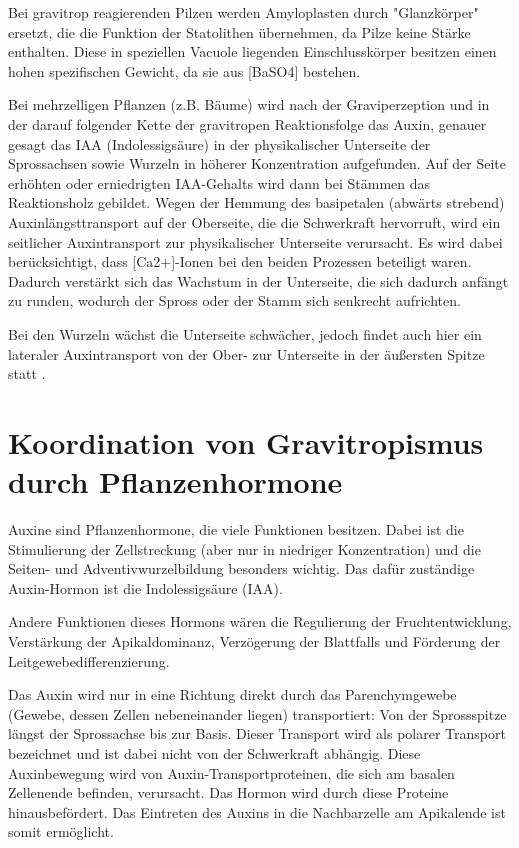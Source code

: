\documentclass[
a4paper, 
11pt, 
ngerman,
listof=totoc,
bibliography=totocnumbered,
abstracton
]{scrreprt}
\begin{document}
Bei gravitrop reagierenden Pilzen werden Amyloplasten durch "Glanzkörper" ersetzt, die die Funktion der Statolithen übernehmen, da Pilze keine Stärke enthalten. Diese in speziellen Vacuole liegenden Einschlusskörper besitzen einen hohen spezifischen Gewicht, da sie aus [BaSO4] bestehen.

Bei mehrzelligen Pflanzen (z.B. Bäume) wird  nach der Graviperzeption und in der darauf folgender Kette der gravitropen Reaktionsfolge  das Auxin, genauer gesagt das IAA (Indolessigsäure) in der physikalischer Unterseite der Sprossachsen sowie Wurzeln in höherer Konzentration aufgefunden.
Auf der Seite erhöhten oder erniedrigten IAA-Gehalts wird dann bei Stämmen das Reaktionsholz gebildet.
Wegen der Hemmung des basipetalen (abwärts strebend) Auxinlängsttransport auf der Oberseite, die die Schwerkraft hervorruft, wird ein seitlicher Auxintransport zur physikalischer Unterseite verursacht. Es wird dabei berücksichtigt, dass [Ca2+]-Ionen bei den beiden Prozessen beteiligt waren.
Dadurch verstärkt sich das Wachstum in der Unterseite, die sich dadurch anfängt zu runden, wodurch der Spross oder der Stamm sich senkrecht aufrichten. 

Bei den Wurzeln wächst die Unterseite schwächer, jedoch findet auch hier ein lateraler Auxintransport von der Ober- zur Unterseite in der äußersten Spitze statt \parencite[453f]{Strasburger}.
    
\section{Koordination von Gravitropismus durch Pflanzenhormone}

Auxine sind Pflanzenhormone, die viele Funktionen besitzen. Dabei ist die Stimulierung der Zellstreckung (aber nur in niedriger Konzentration) und die Seiten- und Adventivwurzelbildung besonders wichtig. Das dafür zuständige Auxin-Hormon ist die Indolessigsäure (IAA).
 
Andere Funktionen dieses Hormons wären die Regulierung der Fruchtentwicklung, Verstärkung der Apikaldominanz, Verzögerung der Blattfalls und Förderung der Leitgewebedifferenzierung.

Das Auxin wird nur in eine Richtung direkt durch das Parenchymgewebe (Gewebe, dessen Zellen nebeneinander liegen) transportiert: Von der Sprossspitze längst der Sprossachse bis zur Basis. Dieser Transport wird als polarer Transport bezeichnet und ist dabei nicht von der Schwerkraft abhängig. Diese Auxinbewegung wird von Auxin-Transportproteinen, die sich am basalen Zellenende befinden, verursacht.
Das Hormon wird durch diese Proteine hinausbefördert. Das Eintreten des Auxins in die Nachbarzelle am Apikalende ist somit ermöglicht.
\end{document}
